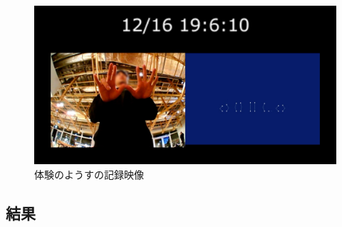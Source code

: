 \begin{figure}[H]
  \centering
  \includegraphics[width=15cm]{img/record_monitor.jpg}
  \caption{体験のようすの記録映像}
  \label{fig:record_monitor}
\end{figure}

\subsection{結果}
